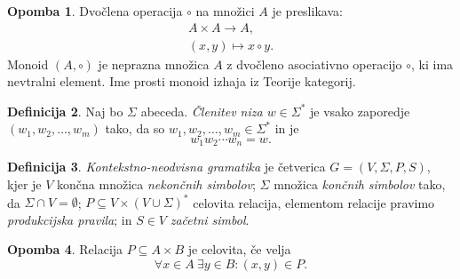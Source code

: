 \documentclass{amsart}
\theoremstyle{definition}
\newtheorem{definicija}{Definicija}[section]
\newtheorem{opomba}[definicija]{Opomba}
\theoremstyle{plain} %
\begin{document}
\begin{opomba}
    
    Dvočlena operacija $ \circ $ na množici $ A $ je preslikava:
    \begin{gather*}
        A \times A \rightarrow A, \\
        (x,y) \mapsto x \circ y.
    \end{gather*}
    Monoid $ (A, \circ) $ je neprazna množica $ A $ z dvočleno asociativno operacijo $ \circ $,
    ki ima nevtralni element. Ime prosti monoid izhaja iz Teorije kategorij.

\end{opomba}

\begin{definicija}

    Naj bo $ \Sigma $ abeceda. \textit{Členitev niza $ w \in \Sigma^*$} je vsako zaporedje $ (w_1, w_2, \ldots, w_m ) $ tako,
    da so $ w_1, w_2, \ldots, w_m \in \Sigma^* $ in je
    \[
        w_1w_2 \cdots w_n = w.
    \]

\end{definicija}

\begin{definicija}

    \textit{Kontekstno-neodvisna gramatika} je četverica $ G = (V, \Sigma, P, S) $, kjer je
    $ V $ končna množica \textit{nekončnih simbolov}; $ \Sigma $ množica \textit{končnih simbolov}
    tako, da $ \Sigma \cap V = \emptyset $; $ P \subseteq V \times ( V \cup \Sigma )^* $ celovita relacija,
    elementom relacije pravimo \textit{produkcijska pravila}; in $ S \in V $ \textit{začetni simbol}.

\end{definicija}

    


\begin{opomba}
    
    Relacija $ P \subseteq A \times B $ je celovita, če velja
    \[
        \forall x \in A \ \exists y \in B \colon (x,y) \in P.
    \]

\end{opomba}
\end{document}

